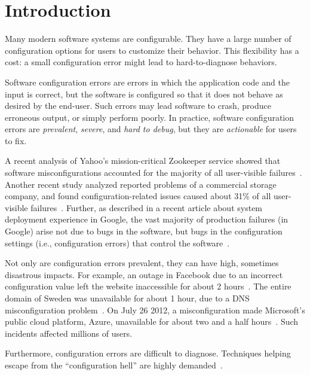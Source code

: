 \section{Introduction}
\label{sec:introduction}

Many modern software systems are configurable. They
have a large number of configuration options for users
to customize their behavior. This flexibility has a cost:
a small configuration error might lead to hard-to-diagnose
behaviors.

Software configuration errors are errors in which
the application code and the input is correct, but the software is
configured so that it does not behave
as desired by the end-user. Such errors may lead software to crash,
produce erroneous output, or simply perform poorly.
In practice, software configuration
errors are \textit{prevalent}, \textit{severe}, and
\textit{hard to debug}, but they are \textit{actionable} for users to fix.


A recent analysis of Yahoo's mission-critical Zookeeper service
showed that software misconfigurations accounted for
the majority of all user-visible failures~\cite{bft}. Another
recent study analyzed reported problems of a commercial
storage company, and found configuration-related issues
caused about 31\% of all user-visible failures~\cite{Yin:2011:ESC}.
Further, as described in a recent article about system deployment experience
in Google, the vast majority of production failures (in Google)
arise not due to bugs in the software, but bugs in the
configuration settings (i.e., configuration errors)
that control the software~\cite{googleconf}.

Not only are configuration errors prevalent, they
can have high, sometimes disastrous impacts. For example,
an outage in Facebook due to
an incorrect configuration value left the website 
inaccessible for about 2 hours~\cite{fbout}. 
The entire  domain of Sweden was unavailable
for about 1 hour, due to a DNS misconfiguration problem~\cite{sedown}.
On July 26 2012, 
a misconfiguration made 
Microsoft's public cloud platform, Azure,
unavailable for about two and a half hours~\cite{msdown}.
Such incidents affected millions of users.

Furthermore, configuration
errors are difficult to diagnose. 
Techniques helping escape from the ``configuration hell''
are highly demanded~\cite{googleconf}.

